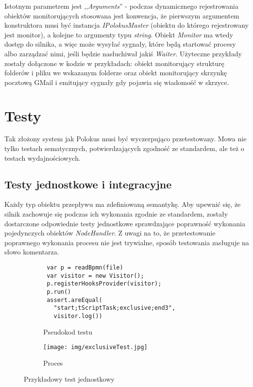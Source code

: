 \documentclass[declaration,shortabstract,mgr]{iithesis}
\begin{document}
 Istotnym parametrem jest ,,\textit{Arguments}'' - podczas dynamicznego rejestrowania obiektów monitorujących stosowana jest konwencja, że pierwszym argumentem konstruktora musi być instancja \textit{IPolokusMaster} (obiektu do którego rejestrowany jest monitor), a kolejne to argumenty typu \textit{string}. Obiekt \textit{Monitor} ma wtedy dostęp do silnika, a więc może wysyłać sygnały, które będą startować procesy albo zarządzać nimi, jeśli będzie nasłuchiwał jakiś \textit{Waiter}. Użyteczne przykłady zostały dołączone w kodzie w przykładach: obiekt monitorujący strukturę folderów i pliku we wskazanym folderze oraz obiekt monitorujący skrzynkę pocztową GMail i emitujący sygnały gdy pojawia się wiadomość w skrzyce.

\chapter{Testy}\label{chapter-tests}
Tak złożony system jak Polokus musi być wyczerpująco przetestowany. 
Mowa nie tylko testach sematycznych, potwierdzających zgodność ze standardem, ale też o testach wydajnościowych.

\section{Testy jednostkowe i integracyjne}
Każdy typ obiektu przepływu ma zdefiniowaną semantykę. Aby upewnić się, że silnik zachowuje się podczas ich wykonania zgodnie ze standardem, zostały dostarczone odpowiednie testy jednostkowe sprawdzające poprawność wykonania pojedynczych obiektów \textit{NodeHandler}. Z uwagi na to, że przetestowanie poprawnego wykonania procesu nie jest trywialne, sposób testowania zasługuje na słowo komentarza.
\begin{figure}[H]
     \centering
     \begin{subfigure}[b]{0.59\textwidth}
\begin{minipage}[c]{\textwidth}
\centering
\begin{lstlisting}
 var p = readBpmn(file)
 var visitor = new Visitor();
 p.registerHooksProvider(visitor);
 p.run()
 assert.areEqual(
   "start;tScriptTask;exclusive;end3",
   visitor.log())
\end{lstlisting}
\end{minipage}
        \caption{Pseudokod testu}
     \end{subfigure}
     \hfill
     \begin{subfigure}[b]{0.39\textwidth}
         \centering
         \texttt{[image: img/exclusiveTest.jpg]}
        \caption{Proces}
     \end{subfigure}
        \caption{Przykładowy test jednostkowy}
        \label{fig:unit-test}
\end{figure}
\end{document}
